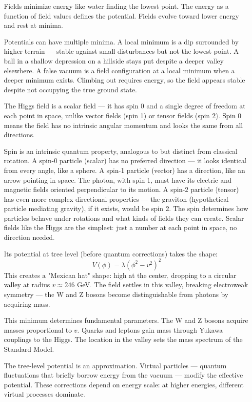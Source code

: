 Fields minimize energy like water finding the lowest point. The energy as a function of field values defines the potential. Fields evolve toward lower energy and rest at minima.

Potentials can have multiple minima. A local minimum is a dip surrounded by higher terrain — stable against small disturbances but not the lowest point. A ball in a shallow depression on a hillside stays put despite a deeper valley elsewhere. A false vacuum is a field configuration at a local minimum when a deeper minimum exists. Climbing out requires energy, so the field appears stable despite not occupying the true ground state.

The Higgs field is a scalar field — it has spin 0 and a single degree of freedom at each point in space, unlike vector fields (spin 1) or tensor fields (spin 2). Spin 0 means the field has no intrinsic angular momentum and looks the same from all directions.

Spin is an intrinsic quantum property, analogous to but distinct from classical rotation. A spin-0 particle (scalar) has no preferred direction — it looks identical from every angle, like a sphere. A spin-1 particle (vector) has a direction, like an arrow pointing in space. The photon, with spin 1, must have its electric and magnetic fields oriented perpendicular to its motion. A spin-2 particle (tensor) has even more complex directional properties — the graviton (hypothetical particle mediating gravity), if it exists, would be spin 2. The spin determines how particles behave under rotations and what kinds of fields they can create. Scalar fields like the Higgs are the simplest: just a number at each point in space, no direction needed.

Its potential at tree level (before quantum corrections) takes the shape:
\[
V(\phi) = \lambda(\phi^2 - v^2)^2
\]
This creates a "Mexican hat" shape: high at the center, dropping to a circular valley at radius $v \approx 246$ GeV. The field settles in this valley, breaking electroweak symmetry — the W and Z bosons become distinguishable from photons by acquiring mass.

This minimum determines fundamental parameters. The W and Z bosons acquire masses proportional to $v$. Quarks and leptons gain mass through Yukawa couplings to the Higgs. The location in the valley sets the mass spectrum of the Standard Model.

The tree-level potential is an approximation. Virtual particles — quantum fluctuations that briefly borrow energy from the vacuum — modify the effective potential. These corrections depend on energy scale: at higher energies, different virtual processes dominate.

